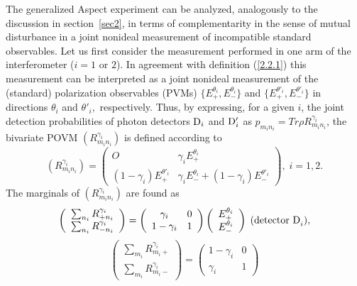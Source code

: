\documentclass[12pt]{article}
\begin{document}
{The generalized Aspect experiment can be analyzed, analogously to
the discussion in section~\ref{sec2}, in terms of complementarity
in the sense of mutual disturbance in a joint nonideal measurement
of incompatible standard observables. Let us first consider the
measurement performed in one arm of the interferometer ($i=1$ or
$2$). In agreement with definition (\ref{2.2.1}) this measurement
can be interpreted as a joint nonideal measurement of the
(standard) polarization observables (PVMs)
$\{{E}^{\theta_i}_+,{E}^{\theta_i}_-\}$ and
$\{{E}^{\theta'_i}_+,{E}^{\theta'_i}_-\}$ in directions $\theta_i$
and $\theta'_i,$ respectively. Thus, by expressing, for a given
$i$, the joint detection probabilities of photon detectors ${\rm
D}_i$ and ${\rm D}'_i$ as $p_{m_in_i}=Tr \rho
R^{\gamma_i}_{m_in_i}$, the bivariate POVM
$(R^{\gamma_i}_{m_in_i})$ is defined according to
\begin{equation}\label{12}(R^{\gamma_i}_{m_in_i}) = \left(
\begin{array}{cc}
O & \gamma_i E^{\theta_i}_+\\
(1-\gamma_i)E^{\theta'_i}_+ &  \gamma_i E^{\theta_i}_- + (1 -
\gamma_i) E^{\theta'_i}_-
\end{array} \right),\;i=1,2.\end{equation}
The marginals of $(R^{\gamma_i}_{m_in_i})$ are found as
 \begin{equation}\label{8}\left(
\begin{array}{c} \sum_{n_i} {R}^{\gamma_i}_{+n_i}\\ \sum_{n_i} {R}^{\gamma_i}_{-n_i}
\end{array} \right)  =
\left( \begin{array}{cc} \gamma_i & 0 \\ 1-\gamma_i  & 1
\end{array} \right)
\left( \begin{array}{c} {E}^{\theta_i}_{+} \\ {E}^{\theta_i}_{-}
\end{array} \right)\; \mbox{\rm (detector D}_i ),\end{equation}
 \begin{equation}\label{9} \left( \begin{array}{c} \sum_{m_i} {R}^{\gamma_i}_{m_i+}\\ \sum_{m_i} {R}^{\gamma_i}_{m_i-}
\end{array} \right) =
\left( \begin{array}{cc} 1-\gamma_i & 0 \\ \gamma_i & 1
\end{array} \right)

\end{equation}}
\end{document}
